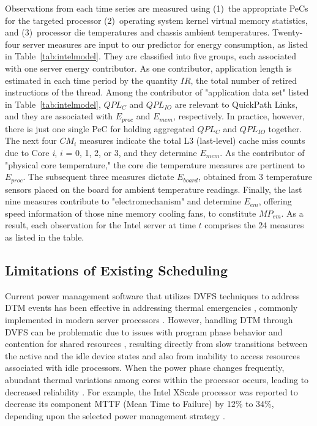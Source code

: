 \documentclass[times, 10pt,twocolumn]{IEEEtran}
\begin{document}
Observations from each time series are measured using (1)~the
appropriate PeCs for the targeted processor (2)~operating system kernel
virtual memory statistics, and (3)~processor die temperatures and
chassis ambient temperatures.  Twenty-four server measures are input to
our predictor for energy consumption, as listed in
Table~\ref{tab:intelmodel}.  They are classified into five groups, each
associated with one server energy contributor.  As one contributor,
application length is estimated in each time period by the quantity
$IR$, the total number of retired instructions of the thread.  Among the
contributor of "application data set" listed in Table~\ref{tab:intelmodel}, $QPL_{C}$ and
$QPL_{IO}$ are relevant to QuickPath Links, and they are associated with $E_{proc}$
and $E_{mem}$, respectively.  In practice, however, there is just one
single PeC for holding aggregated $QPL_{C}$ and $QPL_{IO}$ together.
The next four $CM_{i}$ measures indicate the total L3 (last-level) cache
miss counts due to Core \textit{i}, $i$ = 0, 1, 2, or 3, and they
determine $E_{mem}$.  As the contributor of "physical core temperature,"
the core die temperature measures are pertinent to $E_{proc}$.  The
subsequent three measures dictate $E_{board}$, obtained from 3
temperature sensors placed on the board for ambient temperature
readings.  Finally, the last nine measures contribute to
"electromechanism" and determine $E_{em}$, offering speed information of
those nine memory cooling fans, to constitute $MP_{em}$.  As a result,
each observation for the Intel server at time $t$ comprises the 24
measures as listed in the table.

\subsection{Limitations of Existing Scheduling}
\label{sec:shortc-comp-workl}
Current power management software that utilizes DVFS techniques to
address DTM events has been effective in addressing thermal emergencies
\cite{Donald2006,Hanson2007}, commonly implemented in modern server
processors \cite{AMD2007,Intel2009}.  However, handling DTM through DVFS
can be problematic due to issues with program phase behavior and
contention for shared resources \cite{Bircher2008,Coskun2008d},
resulting directly from slow transitions between the active and the idle
device states and also from inability to access resources associated
with idle processors.  When the power phase changes frequently, abundant
thermal variations among cores within the processor occurs, leading to
decreased reliability \cite{Rosing2007,Coskun2008d,Kursun2009}.  For
example, the Intel XScale processor was reported to decrease its
component MTTF (Mean Time to Failure) by 12\% to 34\%, depending upon
the selected power management strategy \cite{Rosing2007}.
\end{document}
